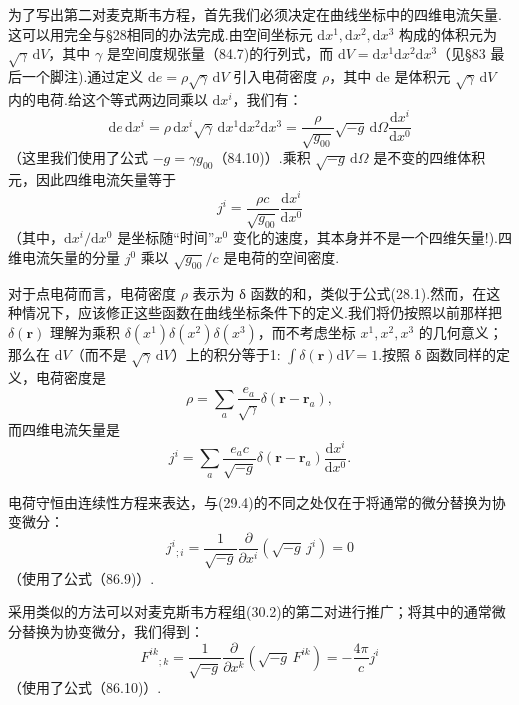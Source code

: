 为了写出第二对麦克斯韦方程，首先我们必须决定在曲线坐标中的四维电流矢量.这可以用完全与§28相同的办法完成.由空间坐标元 $\mathrm{d}x^1,\mathrm{d}x^2,\mathrm{d}x^3$ 构成的体积元为 $\sqrt{\gamma}\,\mathrm{d}V$，其中 $\gamma$ 是空间度规张量（84.7)的行列式，而 $\mathrm{d}V=\mathrm{d}x^1\mathrm{d}x^2\mathrm{d}x^3$（见§83 最后一个脚注).通过定义 $\mathrm{d}e=\rho\sqrt{\gamma}\,\mathrm{d}V$ 引入电荷密度 $\rho$，其中 de 是体积元 $\sqrt{\gamma}\,\mathrm{d}V$ 内的电荷.给这个等式两边同乘以 $\mathrm{d}x^i$，我们有：
\begin{equation*}
  \mathrm{d}e\,\mathrm{d}x^i=\rho\,\mathrm{d}x^i\sqrt{\gamma}\,
  \mathrm{d}x^1\mathrm{d}x^2\mathrm{d}x^3
  =\frac{\rho}{\sqrt{g_{00}}}\sqrt{-g}\,\mathrm{d}\varOmega
  \frac{\mathrm{d}x^i}{\mathrm{d}x^0}
\end{equation*}
（这里我们使用了公式 $-g=\gamma g_{00}$（84.10)）.乘积 $\sqrt{-g}\,\mathrm{d}\varOmega$ 是不变的四维体积元，因此四维电流矢量等于
\begin{equation}
  j^i=\frac{\rho c}{\sqrt{g_{00}}}\frac{\mathrm{d}x^i}{\mathrm{d}x^0}
\end{equation}
（其中，$\mathrm{d}x^i/\mathrm{d}x^0$ 是坐标随“时间”$x^0$ 变化的速度，其本身并不是一个四维矢量!).四维电流矢量的分量 $j^0$ 乘以 $\sqrt{g_{00}}/c$ 是电荷的空间密度.

对于点电荷而言，电荷密度 $\rho$ 表示为 δ 函数的和，类似于公式(28.1).然而，在这种情况下，应该修正这些函数在曲线坐标条件下的定义.我们将仍按照以前那样把 $\delta(\boldsymbol{r})$ 理解为乘积 $\delta(x^1)\delta(x^2)\delta(x^3)$，而不考虑坐标 $x^1,x^2,x^3$ 的几何意义；那么在 $\mathrm{d}V$（而不是 $\sqrt{\gamma}\,\mathrm{d}V$）上的积分等于1: $\int\delta(\boldsymbol{r})\mathrm{d}V=1$.按照 δ 函数同样的定义，电荷密度是
\begin{equation*}
  \rho=\sum_a\frac{e_a}{\sqrt{\gamma}}\delta(\boldsymbol{r}-\boldsymbol{r}_a),
\end{equation*}
而四维电流矢量是
\begin{equation}
  j^i=\sum_a\frac{e_ac}{\sqrt{-g}}\delta(\boldsymbol{r}-\boldsymbol{r}_a)
  \frac{\mathrm{d}x^i}{\mathrm{d}x^0}.
\end{equation}

电荷守恒由连续性方程来表达，与(29.4)的不同之处仅在于将通常的微分替换为协变微分：
\begin{equation}
  j^i{}_{;i}=\frac{1}{\sqrt{-g}}
  \frac{\partial}{\partial x^i}\left(\sqrt{-g}\,j^i\right)=0
\end{equation}
（使用了公式（86.9)）.

采用类似的方法可以对麦克斯韦方程组(30.2)的第二对进行推广；将其中的通常微分替换为协变微分，我们得到：
\begin{equation}
  F^{ik}{}_{;k}=\frac{1}{\sqrt{-g}}
  \frac{\partial}{\partial x^k}\left(\sqrt{-g}\,F^{ik}\right)
  =-\frac{4\pi}{c}j^i
\end{equation}
（使用了公式（86.10)）.

